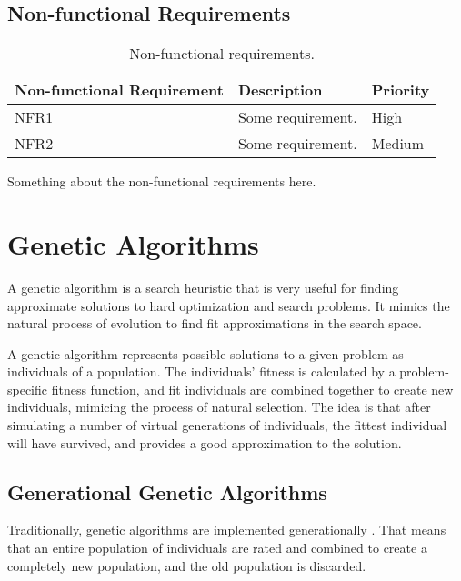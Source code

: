  \subsection{Non-functional Requirements}

 \begin{table}
 \begin{center}
 \begin{tabular}{| l | l | l |}
 \hline
 Non-functional Requirement & Description & Priority \\
 \hline
 NFR1 & Some requirement. & High \\
 NFR2 & Some requirement. & Medium \\
 \hline
 \end{tabular}
 \caption{Non-functional requirements.}
 \label{table:non-functional-requirements}
 \end{center}
 \end{table}

Something about the non-functional requirements here.

\section{Genetic Algorithms}

A genetic algorithm is a search heuristic that is very useful for finding approximate solutions to hard optimization and search problems.
It mimics the natural process of evolution to find fit approximations in the search space.

A genetic algorithm represents possible solutions to a given problem as individuals of a population.
The individuals' fitness is calculated by a problem-specific fitness function, and fit individuals are combined together to create new individuals, mimicing the process of natural selection.
The idea is that after simulating a number of virtual generations of individuals, the fittest individual will have survived, and provides a good approximation to the solution.

\subsection{Generational Genetic Algorithms}

Traditionally, genetic algorithms are implemented generationally .
That means that an entire population of individuals are rated and combined to create a completely new population, and the old population is discarded.

